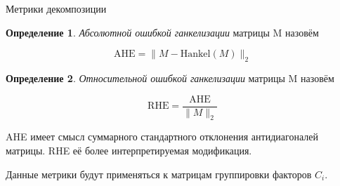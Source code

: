 \documentclass[10pt]{beamer}
\theoremstyle{definition}
\newtheorem*{Def}{Определение}
\begin{document}
	\begin{frame}{Метрики декомпозиции}
		
		\begin{Def}
			\emph{Абсолютной ошибкой ганкелизации} матрицы M назовём 
			
			\[
			\text{AHE} = \lVert M - \text{Hankel}(M) \rVert_2
			\] 
		\end{Def}
		
		\begin{Def}		
			
			\emph{Относительной ошибкой ганкелизации} матрицы M назовём 
			
			\[
			\text{RHE} = \frac{\text{AHE}}{\lVert M \rVert_2} 
			\] 		
			
		\end{Def}
		
		AHE имеет смысл суммарного стандартного отклонения антидиагоналей матрицы. RHE её более интерпретируемая модификация. 
		
		Данные метрики будут применяться к матрицам группировки факторов $ C_i $.
	
	\end{frame}
	
\end{document}
